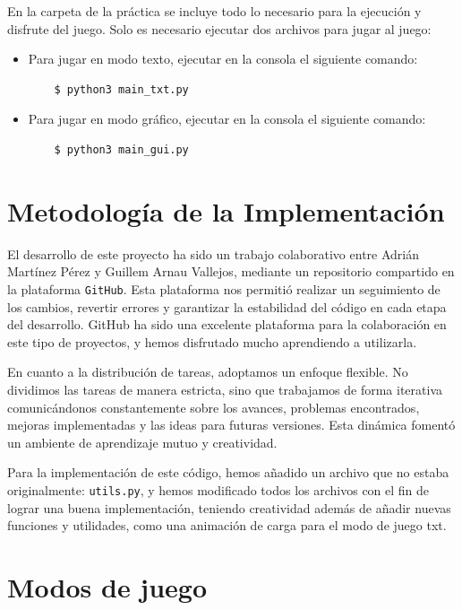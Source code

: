 \documentclass[a4paper,12pt]{article}
\begin{document}
En la carpeta de la práctica se incluye todo lo necesario para la ejecución y disfrute del juego. Solo es necesario
ejecutar dos archivos para jugar al juego:

\begin{itemize}
    \item Para jugar en modo texto, ejecutar en la consola el siguiente comando:
    \begin{verbatim}
    $ python3 main_txt.py
    \end{verbatim}
    \item Para jugar en modo gráfico, ejecutar en la consola el siguiente comando:
    \begin{verbatim}
    $ python3 main_gui.py
    \end{verbatim}
\end{itemize}

\section{Metodología de la Implementación}
El desarrollo de este proyecto ha sido un trabajo colaborativo entre Adrián Martínez Pérez y Guillem Arnau Vallejos,
mediante un repositorio compartido en la plataforma \texttt{GitHub}. Esta plataforma nos permitió realizar un seguimiento
de los cambios, revertir errores y garantizar la estabilidad del código en cada etapa del desarrollo. GitHub ha sido una 
excelente plataforma para la colaboración en este tipo de proyectos, y hemos disfrutado mucho aprendiendo a utilizarla.

\vspace{\baselineskip}
En cuanto a la distribución de tareas, adoptamos un enfoque flexible. No dividimos las tareas de manera estricta, sino que
trabajamos de forma iterativa comunicándonos constantemente sobre los avances, problemas encontrados, mejoras implementadas y 
las ideas para futuras versiones. Esta dinámica fomentó un ambiente de aprendizaje mutuo y creatividad.

\vspace{\baselineskip}
Para la implementación de este código, hemos añadido un archivo que no estaba originalmente: \texttt{utils.py}, y hemos
modificado todos los archivos con el fin de lograr una buena implementación, teniendo creatividad además de añadir nuevas
funciones y utilidades, como una animación de carga para el modo de juego txt.

\section{Modos de juego}
\vspace{\baselineskip}
\vspace{\baselineskip}
\vspace{\baselineskip}
\vspace{\baselineskip}
\end{document}
